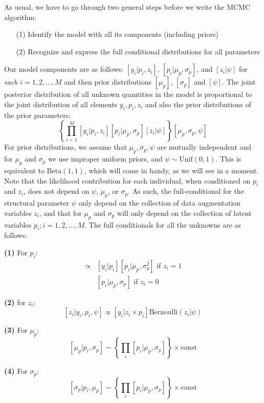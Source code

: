 As usual, we have to go through two general steps before we write the MCMC algorithm:
\begin{itemize}
\item[  (1)] Identify the model with all its components (including
    priors)
\item[  (2)] Recognize and express the full conditional distributions for
    all parameters
\end{itemize}
Our model components are as follows: $[y_{i}| p_{i},z_{i}]$,
$[p_{i}|\mu_{p},\sigma_{p}]$, and $[z_{i}|\psi]$
for {\it each} $i=1,2,\ldots,M$ and then prior distributions
$[\mu_{p}]$, $[\sigma_{p}]$ and $[\psi]$.
The joint posterior distribution of all unknown quantities in the model
is proportional to the joint distribution of all elements
$y_{i},p_{i},z_{i}$ and also the prior distributions of the prior parameters:
\[
\left\{ \prod_{i=1}^{M} [y_{i}|p_{i},z_{i}][p_{i}|\mu_{p},\sigma_{p}]
[z_{i}|\psi] \right\} [\mu_{p},\sigma_{p},\psi]
\]
For prior distributions, we assume that $\mu_{p},\sigma_{p}, \psi$ are
mutually independent and for $\mu_{p}$ and $\sigma_{p}$ we use
improper uniform priors, and $\psi \sim \mbox{Unif}(0,1)$.  This is
equivalent to $\mbox{Beta}(1,1)$, which will come in handy, as we will
see in a moment. Note that the likelihood contribution for each
individual, when conditioned on $p_{i}$ and $z_{i}$, does not depend
on $\psi$, $\mu_{p}$, or $\sigma_{p}$.  As such, the full-conditional
for the structural parameter $\psi$ only depend on the collection of
data augmentation variables $z_{i}$, and that for $\mu_{p}$ and
$\sigma_{p}$ will only depend on the collection of latent variables
$p_{i}; i=1,2,\ldots,M$.  The full conditionals for all the unknowns
are as follows:

{\bf (1)} For $p_{i}$:
\begin{eqnarray*}
[p_{i}|y_{i}, \mu_p, \sigma_{p},z_{i}] &\propto  &
[y_{i}|p_{i}][p_{i}|\mu_p,\sigma_{p}^{2}] \mbox{ if $z_{i}=1$ }  \\
                 &  &  [p_{i}|\mu_p,\sigma_{p}] \mbox{ if $z_{i}=0$ }
\end{eqnarray*}

{\bf (2)} for $z_{i}$:
\[
[z_{i} | y_{i}, p_{i}, \psi] \propto [y_{i}|z_{i} \times p_{i}] \mbox{Bernoulli}(z_{i}|\psi)
\]

{\bf (3)} For $\mu_{p}$:
\[
[\mu_{p} | p_{i}, \sigma_{p}] \sim \left\{ \prod_{i} [p_{i}|\mu_{p}, \sigma_{p}] \right\} \times \mbox{const}
\]

{\bf (4)} For $\sigma_{p}$:
\[
[ \sigma_{p}|p_{i}, \mu_{p} ] \sim \left\{ \prod_{i}[p_{i}| \mu_{p},\sigma_{p} ] \right\} \times \mbox{const}
\]

